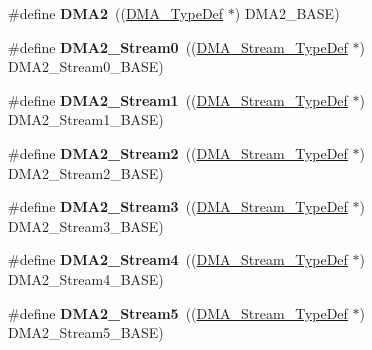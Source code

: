 \begin{DoxyCompactItemize}
\mbox{\label{group___peripheral__declaration_ga506520140eec1708bc7570c49bdf972d}} 
\#define {\bfseries D\+M\+A2}~((\mbox{\hyperlink{struct_d_m_a___type_def}{D\+M\+A\+\_\+\+Type\+Def}} $\ast$) D\+M\+A2\+\_\+\+B\+A\+SE)
\item 
\mbox{\label{group___peripheral__declaration_ga3a2efe5fd7a7a79be3b08a1670bbd016}} 
\#define {\bfseries D\+M\+A2\+\_\+\+Stream0}~((\mbox{\hyperlink{struct_d_m_a___stream___type_def}{D\+M\+A\+\_\+\+Stream\+\_\+\+Type\+Def}} $\ast$) D\+M\+A2\+\_\+\+Stream0\+\_\+\+B\+A\+SE)
\item 
\mbox{\label{group___peripheral__declaration_gae96f15d34d3c41c16fce69bc2878151a}} 
\#define {\bfseries D\+M\+A2\+\_\+\+Stream1}~((\mbox{\hyperlink{struct_d_m_a___stream___type_def}{D\+M\+A\+\_\+\+Stream\+\_\+\+Type\+Def}} $\ast$) D\+M\+A2\+\_\+\+Stream1\+\_\+\+B\+A\+SE)
\item 
\mbox{\label{group___peripheral__declaration_ga71bb410664b861ff0520f08976e24ee1}} 
\#define {\bfseries D\+M\+A2\+\_\+\+Stream2}~((\mbox{\hyperlink{struct_d_m_a___stream___type_def}{D\+M\+A\+\_\+\+Stream\+\_\+\+Type\+Def}} $\ast$) D\+M\+A2\+\_\+\+Stream2\+\_\+\+B\+A\+SE)
\item 
\mbox{\label{group___peripheral__declaration_gaa6ead6a5ca6b8df70b5505aaeec6fd2e}} 
\#define {\bfseries D\+M\+A2\+\_\+\+Stream3}~((\mbox{\hyperlink{struct_d_m_a___stream___type_def}{D\+M\+A\+\_\+\+Stream\+\_\+\+Type\+Def}} $\ast$) D\+M\+A2\+\_\+\+Stream3\+\_\+\+B\+A\+SE)
\item 
\mbox{\label{group___peripheral__declaration_gae32674772021620800275dd3b6d62c2f}} 
\#define {\bfseries D\+M\+A2\+\_\+\+Stream4}~((\mbox{\hyperlink{struct_d_m_a___stream___type_def}{D\+M\+A\+\_\+\+Stream\+\_\+\+Type\+Def}} $\ast$) D\+M\+A2\+\_\+\+Stream4\+\_\+\+B\+A\+SE)
\item 
\mbox{\label{group___peripheral__declaration_gac40f58718761251875b5a897287efd83}} 
\#define {\bfseries D\+M\+A2\+\_\+\+Stream5}~((\mbox{\hyperlink{struct_d_m_a___stream___type_def}{D\+M\+A\+\_\+\+Stream\+\_\+\+Type\+Def}} $\ast$) D\+M\+A2\+\_\+\+Stream5\+\_\+\+B\+A\+SE)

\end{DoxyCompactItemize}
